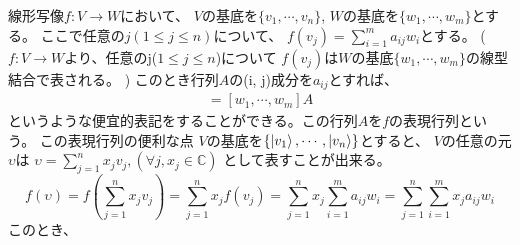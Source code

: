 \color{red}{\large 復習:(表現行列の定義)}

線形写像$f:V \to W$において、
$V$の基底を$\{v_1, \cdots, v_n\}$, $W$の基底を$\{w_1,\cdots, w_m\}$とする。
\newline
ここで任意の$j (1\leq j\leq n)$について、
$f(v_j) = \sum_{i=1}^m a_{ij}w_i$とする。
\newline
($f:V \to W$より、任意のj($1\leq j\leq n$)について
$f(v_j)$は$W$の基底$\{w_1, \cdots, w_m\}$の線型結合で表される。
)
\newline
このとき行列$A$の(i, j)成分を$a_{ij}$とすれば、 
\begin{eqnarray*}
[f(v_1), \cdots, f(v_n)] = [w_1, \cdots, w_m]A
\end{eqnarray*}
というような便宜的表記をすることができる。この行列$A$を$f$の表現行列という。
\newline
 この表現行列の便利な点
\newline
$V$の基底を$\{\ket{v_1},\cdots, \ket{v_n}\}$とすると、 
$V$の任意の元$\upsilon$は
$\upsilon = \sum_{j=1}^n x_j v_j, (\forall j, x_j \in \mathbb{C})$
として表すことが出来る。
\newline
\[
f(\upsilon) =
f(\sum_{j=1}^n x_j v_j) = 
\sum_{j=1}^n x_j f(v_j) =
\sum_{j=1}^n x_j \sum_{i=1}^m a_{ij}w_i = 
\sum_{j=1}^n \sum_{i=1}^m x_j a_{ij}w_i
\]
このとき、
